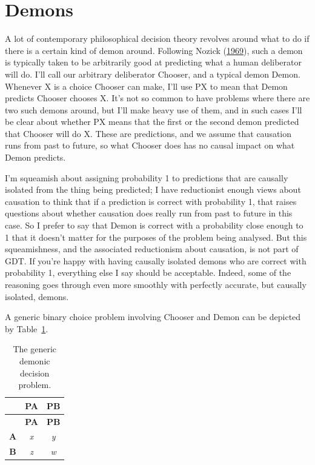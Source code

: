 \documentclass[
  12pt,
  letterpaper,
  DIV=11,
  numbers=noendperiod]{scrreprt}
\begin{document}
\hypertarget{sec-intro-demons}{%
\section{Demons}\label{sec-intro-demons}}

A lot of contemporary philosophical decision theory revolves around what
to do if there is a certain kind of demon around. Following Nozick
(\protect\hyperlink{ref-Nozick1969}{1969}), such a demon is typically
taken to be arbitrarily good at predicting what a human deliberator will
do. I'll call our arbitrary deliberator Chooser, and a typical demon
Demon. Whenever X is a choice Chooser can make, I'll use PX to mean that
Demon predicts Chooser chooses X. It's not so common to have problems
where there are two such demons around, but I'll make heavy use of them,
and in such cases I'll be clear about whether PX means that the first or
the second demon predicted that Chooser will do X. These are
predictions, and we assume that causation runs from past to future, so
what Chooser does has no causal impact on what Demon predicts.

I'm squeamish about assigning probability 1 to predictions that are
causally isolated from the thing being predicted; I have reductionist
enough views about causation to think that if a prediction is correct
with probability 1, that raises questions about whether causation does
really run from past to future in this case. So I prefer to say that
Demon is correct with a probability close enough to 1 that it doesn't
matter for the purposes of the problem being analysed. But this
squeamishness, and the associated reductionism about causation, is not
part of GDT. If you're happy with having causally isolated demons who
are correct with probability 1, everything else I say should be
acceptable. Indeed, some of the reasoning goes through even more
smoothly with perfectly accurate, but causally isolated, demons.

A generic binary choice problem involving Chooser and Demon can be
depicted by Table~\ref{tbl-gen-dem-problem-text}.

\hypertarget{tbl-gen-dem-problem-text}{}
\begin{longtable}[]{@{}ccc@{}}
\caption{\label{tbl-gen-dem-problem-text}The generic demonic decision
problem.}\tabularnewline
\toprule\noalign{}
& \textbf{PA} & \textbf{PB} \\
\midrule\noalign{}
\endfirsthead
\toprule\noalign{}
& \textbf{PA} & \textbf{PB} \\
\midrule\noalign{}
\endhead
\bottomrule\noalign{}
\endlastfoot
\textbf{A} & \emph{x} & \emph{y} \\
\textbf{B} & \emph{z} & \emph{w} \\
\end{longtable}
\end{document}
